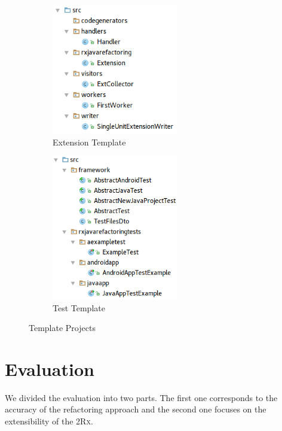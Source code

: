 \documentclass[type=bsc,accentcolor=tud9c]{tudthesis}
\newcommand{\toolcore}{\textsc{2Rx}}
\begin{document}
\begin{figure}[h]
\begin{subfigure}{0.5\textwidth}
\begin{center}
\includegraphics[width=5.5cm]{templates/extension.png}
\end{center}
\caption{Extension Template}
\label{fig:template-ext}
\end{subfigure}
\begin{subfigure}{0.5\textwidth}
\begin{center}
\includegraphics[width=5.5cm]{templates/tests.png}
\end{center}
\caption{Test Template}
\label{fig:template-test}
\end{subfigure}
\caption{Template Projects}
\end{figure}



\chapter{Evaluation}
\label{chapter:evaluation}
We divided the evaluation into two parts. The first one corresponds to the accuracy of the refactoring approach and the second one focuses on the extensibility of the \toolcore{}.
\end{document}
